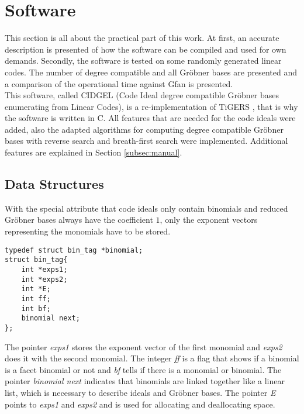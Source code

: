 \section{Software}
\label{sec:software}
This section is all about the practical part of this work. At first, an accurate description is presented of how the software can be compiled and used for own demands.
Secondly, the software is tested on some randomly generated linear codes. The number of degree compatible and all Gröbner bases are presented and a comparison of the operational time against Gfan \cite{gfan} is presented. \\
This software, called CIDGEL (Code Ideal degree compatible Gröbner bases enumerating from Linear Codes), is a re-implementation of TiGERS \cite{tigers}, that is why the software is written in C. All features that are needed for the code ideals were added, also the adapted algorithms for computing degree compatible Gröbner bases with reverse search and breath-first search were implemented.   
Additional features are explained in Section \ref{subsec:manual}.


\subsection{Data Structures}
\label{subsec:datastructure}
With the special attribute that code ideals only contain binomials and reduced Gröbner bases always have the coefficient $1$, only the exponent vectors representing the monomials have to be stored.


\begin{lstlisting} 
typedef struct bin_tag *binomial;
struct bin_tag{
    int *exps1;
    int *exps2;
    int *E;
    int ff;
    int bf;
    binomial next;
};

\end{lstlisting}
\newpage
The pointer \emph{exps1} stores the exponent vector of the first monomial and \emph{exps2} does it with the second monomial.
The integer \emph{ff} is a flag that shows if a binomial is a facet binomial or not and \emph{bf} tells if there is a monomial or binomial.
The pointer \emph{binomial next} indicates that binomials are linked together like a linear list, which is necessary to describe ideals and Gröbner bases. The pointer \emph{E} points to \emph{exps1} and \emph{exps2} and is used for allocating and deallocating space. \\

